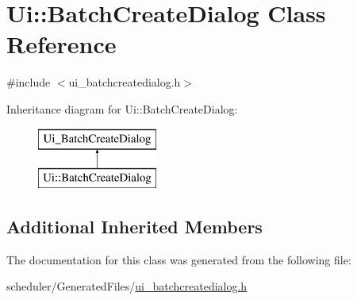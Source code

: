 \hypertarget{class_ui_1_1_batch_create_dialog}{}\section{Ui\+::Batch\+Create\+Dialog Class Reference}
\label{class_ui_1_1_batch_create_dialog}


{\ttfamily \#include $<$ui\+\_\+batchcreatedialog.\+h$>$}

Inheritance diagram for Ui\+::Batch\+Create\+Dialog\+:\begin{figure}[H]
\begin{center}
\leavevmode
\includegraphics[height=2.000000cm]{d7/d36/class_ui_1_1_batch_create_dialog}
\end{center}
\end{figure}
\subsection*{Additional Inherited Members}


The documentation for this class was generated from the following file\+:\begin{DoxyCompactItemize}
\item 
scheduler/\+Generated\+Files/\mbox{\hyperlink{ui__batchcreatedialog_8h}{ui\+\_\+batchcreatedialog.\+h}}\end{DoxyCompactItemize}
